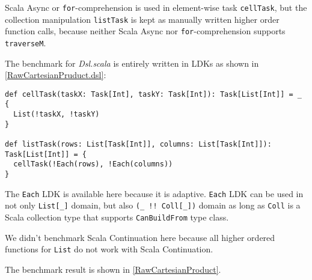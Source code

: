 Scala Async or \lstinline{for}-comprehension is used in element-wise task \lstinline{cellTask}, but the collection manipulation \lstinline{listTask} is kept as manually written higher order function calls, because neither Scala Async nor \lstinline{for}-comprehension supports \lstinline{traverseM}.

The benchmark for \textit{Dsl.scala} is entirely written in LDKs as shown in \cref{RawCartesianPruduct.dsl}:

\begin{lstlisting}[float=htbp,caption={Cartesian product for ordinary CPS functions, based on \textit{Dsl.scala}},label={RawCartesianPruduct.dsl}]
def cellTask(taskX: Task[Int], taskY: Task[Int]): Task[List[Int]] = _ {
  List(!taskX, !taskY)
}

def listTask(rows: List[Task[Int]], columns: List[Task[Int]]): Task[List[Int]] = {
  cellTask(!Each(rows), !Each(columns))
}
\end{lstlisting}

The \lstinline{Each} LDK is available here because it is adaptive. \lstinline{Each} LDK can be used in not only \lstinline{List[_]} domain, but also \lstinline{(_ !! Coll[_])} domain as long as \lstinline{Coll} is a Scala collection type that supports \lstinline{CanBuildFrom} type class.

We didn't benchmark Scala Continuation here because all higher ordered functions for \lstinline{List} do not work with Scala Continuation.

The benchmark result is shown in \cref{RawCartesianProduct}.

